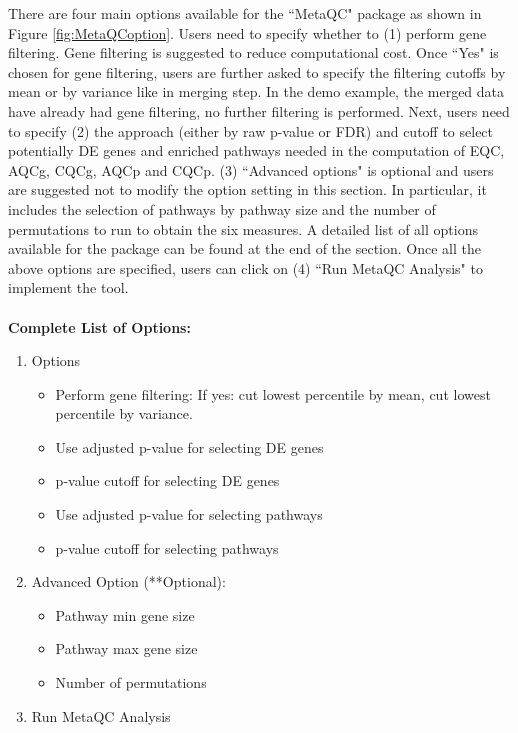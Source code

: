 There are four main options available for the ``MetaQC" package as shown in Figure \ref{fig:MetaQCoption}. 
Users need to specify whether to (1) perform gene filtering. Gene filtering is suggested to reduce computational cost. Once ``Yes" is chosen for gene filtering, users are further asked to specify the filtering cutoffs by mean or by variance like in merging step. In the demo example, the merged data have already had gene filtering, no further filtering is performed.   Next, users need to specify (2) the approach (either by raw p-value or FDR) and cutoff to select potentially DE genes and enriched pathways needed in the computation of EQC, AQCg, CQCg, AQCp and CQCp. (3) ``Advanced options" is optional and users are suggested not to modify the option setting in this section. In particular, it includes the selection of pathways by pathway size and the number of permutations to run to obtain the six measures. A detailed list of all options available for the package can be found at the end of the section. Once all the above options are specified, users can click on (4) ``Run MetaQC Analysis" to implement the tool. \\~\\

\textbf{Complete List of Options:} 

\begin{enumerate}
  \item Options
  \begin{itemize}
     \item Perform gene filtering: If yes: cut lowest percentile by mean, cut lowest percentile by variance. 
     \item Use adjusted p-value for selecting DE genes
     \item p-value cutoff for selecting DE genes
     \item Use adjusted p-value for selecting pathways
     \item p-value cutoff for selecting pathways
    \end{itemize}
   \item Advanced Option (**Optional): 
        \begin{itemize}
      \item Pathway min gene size
      \item Pathway max gene size
      \item Number of permutations
    \end{itemize} 
  \item Run MetaQC Analysis
\end{enumerate}
   


